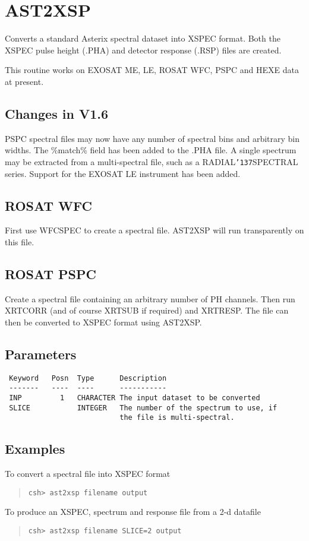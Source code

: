 \documentclass{book}
\renewcommand{\_}{{\tt\char'137}}     %
\begin{document}
\section{AST2XSP}
Converts a standard Asterix spectral dataset into XSPEC format.
Both the XSPEC pulse height (.PHA) and detector response (.RSP)
files are created.

This routine works on EXOSAT ME, LE, ROSAT WFC, PSPC and
HEXE data at present.

\subsection{Changes in V1.6}
PSPC spectral files may now have any number of spectral bins
and arbitrary bin widths. The \%match\% field has been added to the
.PHA file. A single spectrum may be extracted from a multi-spectral
file, such as a RADIAL\_SPECTRAL series. Support for the EXOSAT LE
instrument has been added.

\subsection{ROSAT WFC}
First use WFCSPEC to create a spectral file. AST2XSP will run transparently
on this file.

\subsection{ROSAT PSPC}
Create a spectral file containing an arbitrary number of PH channels.
Then run XRTCORR (and of course XRTSUB if required) and XRTRESP.
The file can then be converted to XSPEC format using AST2XSP.

\subsection{Parameters}
\begin{verbatim}
 Keyword   Posn  Type      Description
 -------   ----  ----      -----------
 INP         1   CHARACTER The input dataset to be converted
 SLICE           INTEGER   The number of the spectrum to use, if
                           the file is multi-spectral.

\end{verbatim}\subsection{Examples}
To convert a spectral file into XSPEC format
\begin{quote}\begin{verbatim}
csh> ast2xsp filename output
\end{verbatim}\end{quote}
To produce an XSPEC, spectrum and response file from a 2-d datafile
\begin{quote}\begin{verbatim}
csh> ast2xsp filename SLICE=2 output
\end{verbatim}\end{quote}
\end{document}
